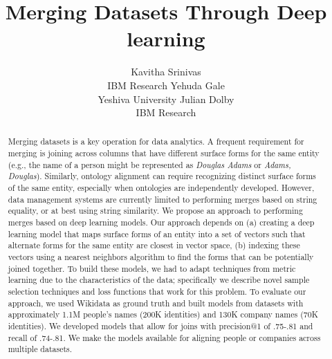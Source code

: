 \documentclass[letterpaper]{article} %
\begin{document}
%
\title{Merging Datasets Through Deep learning}



\author{Kavitha Srinivas \\ IBM Research
\And Yehuda Gale \\ Yeshiva University
\And Julian Dolby \\ IBM Research}


\maketitle
\begin{abstract}
Merging datasets is a key operation for data analytics.  A frequent
requirement for merging is joining across columns that have
different surface forms for the same entity (e.g., the name of a
person might be represented as \textit{Douglas Adams} or
\textit{Adams, Douglas}).  Similarly,
ontology alignment can require recognizing distinct surface forms of
the same entity, especially when ontologies are independently
developed.  However, data management systems are currently limited
to performing merges based on string equality, or at best using
string similarity.  We propose an approach to performing merges
based on deep learning models.  Our approach depends on (a) creating
a deep learning model that maps surface forms of an entity into a
set of vectors such that alternate forms for the same entity are
closest in vector space, (b) indexing these vectors using a nearest
neighbors algorithm to find the forms that can be potentially joined
together.  To build these models, we had to adapt techniques from
metric learning due to the characteristics of the data; specifically we describe 
novel sample selection techniques and loss functions that work for this problem.  
To evaluate our approach, we used Wikidata as ground truth
and built models from datasets with approximately 1.1M people's names
(200K identities) and 130K company names (70K identities).  We developed models that 
allow for joins with precision@1 of .75-.81 and
recall of .74-.81.  We make the models available for aligning people or companies across multiple datasets.  
\end{abstract}








  
  
  
\end{document}
